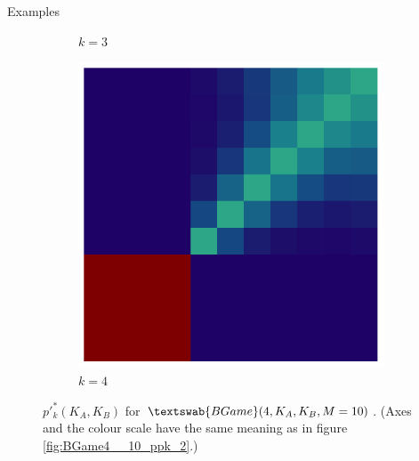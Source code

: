 \documentclass{beamer}
\theoremstyle{definition}
\newcommand{\BG}[1]{$\textswab{BGame}(#1)$}
\begin{document}
\begin{frame}[shrink=10]{Examples}
\begin{figure}[H]
\begin{subfigure}[b]{0.185\textwidth}
        \caption{$k=3$}
        \label{fig:ppkBG_4_3}
    \end{subfigure}
    \hspace{0.00\textwidth} %
        \begin{subfigure}[b]{0.185\textwidth}
        \includegraphics[width=\textwidth]{img/ppkB_Plot_4_4_10.pdf}
        \caption{$k=4$}
        \label{fig:ppkBG_4_4}
    \end{subfigure}

    \caption{\small \centering $p'^*_k(K_A,K_B)$ for \BG{4,K_A,K_B,M=10}.
    (Axes and the colour scale have the same meaning as in figure \ref{fig:BGame4__10_ppk_2}.)
    }
    \label{fig:ppk_InfBG_4_01234}
\end{figure}

\end{frame}
\end{document}
